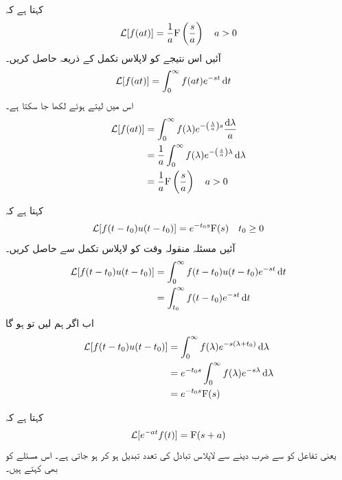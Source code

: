 کہتا ہے کہ
\begin{align}
\mathcal{L}[f(at)]=\frac{1}{a} {{\textup{F}}}\left(\frac{s}{a}\right) \quad a>0
\end{align}
آئیں اس نتیجے کو لاپلاس تکمل کے ذریعہ حاصل کریں۔
\begin{align*}
\Laplace[f(at)]&=\int_0^{\infty} f(at) e^{-st} \dif t
\end{align*}
اس میں  لیتے ہوئے  لکھا جا سکتا ہے۔
\begin{align*}
\Laplace[f(at)]&=\int_0^{\infty} f(\lambda) e^{-\left(\frac{\lambda}{a}\right)s} \frac{\dif \lambda}{a}\\
&=\frac{1}{a}\int_0^{\infty} f(\lambda) e^{-\left(\frac{s}{a}\right)\lambda } \dif \lambda\\
&=\frac{1}{a} \bF\left(\frac{s}{a}\right) \quad a>0
\end{align*}

 کہتا ہے کہ
\begin{align}\label{مساوات_لاپلاس_مسئلہ_منتقلی_وقت}
\mathcal{L}[f(t-t_0)u(t-t_0)]=e^{-t_0 s}{{\textup{F}}}(s) \quad t_0\ge 0
\end{align}
آئیں مسئلہ منقولہ وقت کو لاپلاس تکمل سے حاصل کریں۔
\begin{align*}
\Laplace[f(t-t_0)u(t-t_0)]&=\int_{0}^{\infty} f(t-t_0) u(t-t_0)e^{-st} \dif t\\
&=\int_{t_0}^{\infty} f(t-t_0)e^{-st} \dif t\\
\end{align*}
اب اگر ہم  لیں تو  ہو گا
\begin{align*}
\Laplace[f(t-t_0)u(t-t_0)]&=\int_{0}^{\infty} f(\lambda)e^{-s\left(\lambda+t_0\right)} \dif \lambda\\
&=e^{-t_0 s}\int_0^{\infty}f(\lambda)e^{-s\lambda}\dif \lambda\\
&=e^{-t_0 s}\bF(s)
\end{align*}

 کہتا ہے کہ
\begin{align}
\mathcal{L}[e^{-at} f(t)]={{\textup{F}}}(s+a)
\end{align}
یعنی تفاعل کو  سے ضرب دینے سے لاپلاس تبادل کی تعدد تبدیل ہو کر  ہو جاتی ہے۔ اس مسئلے کو  بھی کہتے ہیں۔

